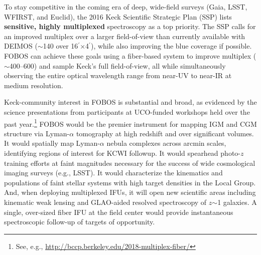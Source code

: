 \documentclass[11pt,letterpaper]{article}
\newcommand\arcmin{\mbox{$^\prime$}}%
\begin{document}
 To stay competitive in the coming
era of deep, wide-field surveys (Gaia, LSST, WFIRST, and Euclid), the
2016 Keck Scientific Strategic Plan (SSP) lists {\bf sensitive, highly
multiplexed} spectroscopy as a top priority. 
The SSP calls for an improved multiplex over a larger field-of-view than
currently available with DEIMOS ($\sim$140 over
16\arcmin$\times$4\arcmin), while also improving the blue coverage if
possible. 
FOBOS can achieve these goals using a fiber-based system to improve
multiplex ($\sim$400--600) and sample Keck's full field-of-view, all
while simultaneously observing the entire optical wavelength range from
near-UV to near-IR at medium resolution.

Keck-community interest in FOBOS is substantial and broad, as evidenced
by the science presentations from participants at UCO-funded workshops
held over the past year.\footnote{See, e.g.,
\url{http://bccp.berkeley.edu/2018-multiplex-fiber/}}  FOBOS would be
the premier instrument for mapping IGM and CGM structure via
Lyman-$\alpha$ tomography at high redshift and over significant volumes.
It would spatially map Lyman-$\alpha$ nebula complexes across arcmin
scales, identifying regions of interest for KCWI followup.  It would
spearhead photo-$z$ training efforts at faint magnitudes necessary for
the success of wide cosmological imaging surveys (e.g., LSST).  It would
characterize the kinematics and populations of faint stellar systems
with high target densities in the Local Group.  And, when deploying
multiplexed IFUs, it will open new scientific areas including kinematic
weak lensing and GLAO-aided resolved spectroscopy of $z$$\sim$1
galaxies.  A single, over-sized fiber IFU at the field center would
provide instantaneous spectroscopic follow-up of targets of opportunity.
\end{document}

